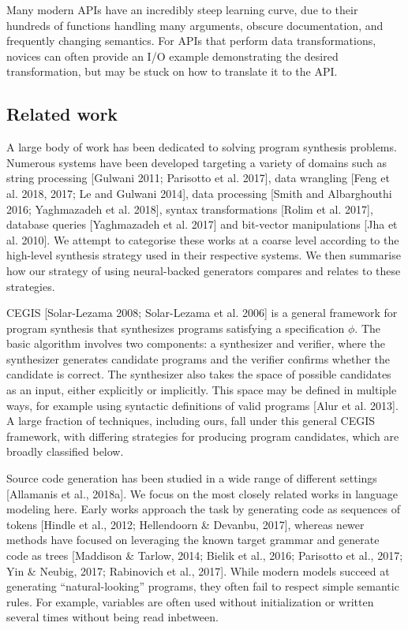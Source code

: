 \documentclass{article}
\begin{document}
Many modern APIs have an incredibly steep learning curve, due to their hundreds of functions handling many arguments, obscure documentation, and frequently changing semantics. For APIs that perform data transformations, novices can often provide an I/O example demonstrating the desired transformation, but may be stuck on how to translate it to the API.
\subsection{Related work}
A large body of work has been dedicated to solving program synthesis problems. Numerous systems have been developed targeting a variety of domains such as string processing [Gulwani 2011; Parisotto et al. 2017], data wrangling [Feng et al. 2018, 2017; Le and Gulwani 2014], data processing [Smith and Albarghouthi 2016; Yaghmazadeh et al. 2018], syntax transformations [Rolim et al. 2017], database queries [Yaghmazadeh et al. 2017] and bit-vector manipulations [Jha et al. 2010]. We attempt to categorise these works at a coarse level according to the high-level synthesis strategy used in their respective systems. We then summarise how our strategy of using neural-backed generators compares and relates to these strategies.

CEGIS [Solar-Lezama 2008; Solar-Lezama et al. 2006] is a general framework for program synthesis that synthesizes programs satisfying a specification $\phi$. The basic algorithm involves two components: a synthesizer and verifier, where the synthesizer generates candidate programs and the verifier confirms whether the candidate is correct. The synthesizer also takes the space of possible candidates as an input, either explicitly or implicitly. This space may be defined in multiple ways, for example using syntactic definitions of valid programs [Alur et al. 2013]. A large fraction of techniques, including ours, fall under this general CEGIS framework, with differing strategies for producing program candidates, which are broadly classified below.

Source code generation has been studied in a wide range of different settings [Allamanis et al., 2018a]. We focus on the most closely related works in language modeling here. Early works approach the task by generating code as sequences of tokens [Hindle et al., 2012; Hellendoorn \& Devanbu, 2017], whereas newer methods have focused on leveraging the known target grammar and generate code as trees [Maddison \& Tarlow, 2014; Bielik et al., 2016; Parisotto et al., 2017; Yin \& Neubig, 2017; Rabinovich et al., 2017]. While modern models succeed at generating “natural-looking” programs, they often fail to respect simple semantic rules. For example, variables are often used without initialization or written several times without being read inbetween.
\end{document}
